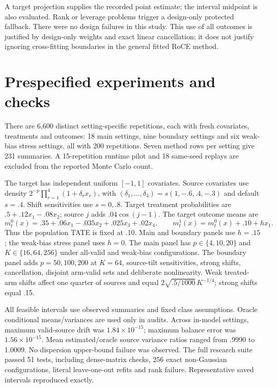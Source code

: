 \documentclass[11pt]{article}
\begin{document}
A target projection supplies the recorded point estimate; the interval midpoint
is also evaluated. Rank or leverage problems trigger a design-only protected
fallback. There were no design failures in this study. This use of all outcomes
is justified by design-only weights and exact linear cancellation; it does not
justify ignoring cross-fitting boundaries in the general fitted RoCE method.

\section{Prespecified experiments and checks}

There are 6,600 distinct setting-specific repetitions, each with fresh covariates,
treatments and outcomes: 18 main settings, nine boundary settings and six
weak-bias stress settings, all with 200 repetitions. Seven method rows per
setting give 231 summaries. A 15-repetition runtime pilot and 18 same-seed
replays are excluded from the reported Monte Carlo count.

The target has independent uniform $[-1,1]$ covariates. Source covariates use
density $2^{-p}\prod_{r=1}^4(1+\delta_r x_r)$, with
$(\delta_1,\ldots,\delta_4)=s(1,-.6,.4,-.3)$ and default $s=.4$.
Shift sensitivities use $s=0,.8$. Target treatment probabilities are
$.5+.12x_1-.08x_2$; source $j$ adds $.04\cos(j-1)$. The target outcome means are
\[
 m_t^0(x)=.35+.06x_1-.035x_2+.025x_3+.02x_4,\qquad
 m_t^1(x)=m_t^0(x)+.10+h x_1.
\]
Thus the population TATE is fixed at .10. Main and boundary panels use
$h=.15$; the weak-bias stress panel uses $h=0$. The main panel has
$p\in\{4,10,20\}$ and $K\in\{16,64,256\}$ under all-valid and weak-bias
configurations. The boundary panel adds $p=50,100,200$ at $K=64$, source-tilt
sensitivities, strong shifts, cancellation, disjoint arm-valid sets and deliberate
nonlinearity. Weak treated-arm shifts affect one quarter of sources and equal
$2\sqrt{.5/1000}\,K^{-1/4}$; strong shifts equal .15.

All feasible intervals use observed summaries and fixed class assumptions.
Oracle conditional means/variances are used only in audits. Across in-model
settings, maximum valid-source drift was $1.84\times10^{-15}$; maximum balance
error was $1.56\times10^{-15}$. Mean estimated/oracle source variance ratios
ranged from .9990 to 1.0009. No dispersion upper-bound failure was observed.
The full research suite passed 51 tests, including dense-matrix checks, 256
exact non-Gaussian configurations, literal leave-one-out refits and rank failure.
Representative saved intervals reproduced exactly.
\end{document}

